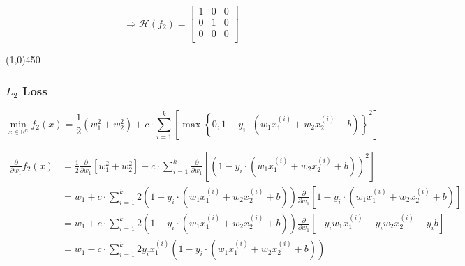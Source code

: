 \documentclass[12pt,landscape]{article}
\newcommand{\hr}{\begin{center} \line(1,0){450} \end{center}}
\begin{document}
\begin{equation}
\Rightarrow \mathcal{H}(f_2) = \begin{bmatrix}
1 & 0 & 0\\
0 & 1 & 0\\
0&0&0\\
\end{bmatrix}
\end{equation}









\hr
\subsubsection*{$L_2$ Loss}
\newcommand{\lTwoLoss}{1-y_i \cdot \left( w_1  x_1^{(i)} + w_2  x_2^{(i)} + b\right)}
\begin{equation}
\min\limits_{x \in \mathbb{R}^n} f_2(x) = \frac{1}{2} \left( w_1^2 + w_2^2 \right) +c    \cdot \sum\limits_{i=1}^k \left[ \max \left\{ 0,\lTwoLoss  \right\}^2\right]
\end{equation}

\newcommand{\multA}{w_1  x_1^{(i)}}
\newcommand{\multAsq}{w_1^2  x_1^{(i)}}
\newcommand{\multB}{w_2  x_2^{(i)}}

\begin{align}
\frac{\partial}{\partial w_1} f_2(x) 
&= \frac{1}{2}   \frac{\partial}{\partial w_1} \left[  w_1^2 + w_2^2 \right] +c \cdot \sum\limits_{i=1}^k \frac{\partial}{\partial w_1}  \left[ \left( \lTwoLoss \right)^2 \right]\nonumber\\
&= w_1 +c \cdot \sum\limits_{i=1}^k  2\left( \lTwoLoss \right) \frac{\partial}{\partial w_1}  \left[ \lTwoLoss \right]\nonumber\\
&= w_1 +c \cdot \sum\limits_{i=1}^k  2\left( \lTwoLoss \right) \frac{\partial}{\partial w_1}  \left[ -y_i w_1  x_1^{(i)} -y_i w_2  x_2^{(i)} -y_i b \right]\nonumber\\
&= w_1 -c \cdot \sum\limits_{i=1}^k  2y_i  x_1^{(i)} \left( \lTwoLoss \right) \\ \nonumber
\end{align}
\end{document}
